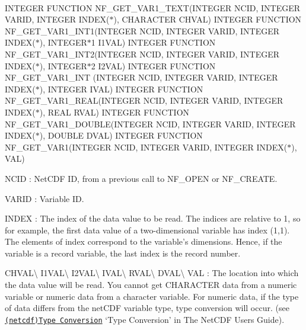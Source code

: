  

I\+N\+T\+E\+G\+ER F\+U\+N\+C\+T\+I\+ON N\+F\+\_\+\+G\+E\+T\+\_\+\+V\+A\+R1\+\_\+\+T\+E\+XT(I\+N\+T\+E\+G\+ER N\+C\+ID, I\+N\+T\+E\+G\+ER V\+A\+R\+ID, I\+N\+T\+E\+G\+ER I\+N\+D\+E\+X($\ast$), C\+H\+A\+R\+A\+C\+T\+ER C\+H\+V\+AL) I\+N\+T\+E\+G\+ER F\+U\+N\+C\+T\+I\+ON N\+F\+\_\+\+G\+E\+T\+\_\+\+V\+A\+R1\+\_\+\+I\+N\+T1(I\+N\+T\+E\+G\+ER N\+C\+ID, I\+N\+T\+E\+G\+ER V\+A\+R\+ID, I\+N\+T\+E\+G\+ER I\+N\+D\+E\+X($\ast$), I\+N\+T\+E\+G\+E\+R$\ast$1 I1\+V\+AL) I\+N\+T\+E\+G\+ER F\+U\+N\+C\+T\+I\+ON N\+F\+\_\+\+G\+E\+T\+\_\+\+V\+A\+R1\+\_\+\+I\+N\+T2(I\+N\+T\+E\+G\+ER N\+C\+ID, I\+N\+T\+E\+G\+ER V\+A\+R\+ID, I\+N\+T\+E\+G\+ER I\+N\+D\+E\+X($\ast$), I\+N\+T\+E\+G\+E\+R$\ast$2 I2\+V\+AL) I\+N\+T\+E\+G\+ER F\+U\+N\+C\+T\+I\+ON N\+F\+\_\+\+G\+E\+T\+\_\+\+V\+A\+R1\+\_\+\+I\+NT (I\+N\+T\+E\+G\+ER N\+C\+ID, I\+N\+T\+E\+G\+ER V\+A\+R\+ID, I\+N\+T\+E\+G\+ER I\+N\+D\+E\+X($\ast$), I\+N\+T\+E\+G\+ER I\+V\+AL) I\+N\+T\+E\+G\+ER F\+U\+N\+C\+T\+I\+ON N\+F\+\_\+\+G\+E\+T\+\_\+\+V\+A\+R1\+\_\+\+R\+E\+AL(I\+N\+T\+E\+G\+ER N\+C\+ID, I\+N\+T\+E\+G\+ER V\+A\+R\+ID, I\+N\+T\+E\+G\+ER I\+N\+D\+E\+X($\ast$), R\+E\+AL R\+V\+AL) I\+N\+T\+E\+G\+ER F\+U\+N\+C\+T\+I\+ON N\+F\+\_\+\+G\+E\+T\+\_\+\+V\+A\+R1\+\_\+\+D\+O\+U\+B\+LE(I\+N\+T\+E\+G\+ER N\+C\+ID, I\+N\+T\+E\+G\+ER V\+A\+R\+ID, I\+N\+T\+E\+G\+ER I\+N\+D\+E\+X($\ast$), D\+O\+U\+B\+LE D\+V\+AL) I\+N\+T\+E\+G\+ER F\+U\+N\+C\+T\+I\+ON N\+F\+\_\+\+G\+E\+T\+\_\+\+V\+A\+R1(I\+N\+T\+E\+G\+ER N\+C\+ID, I\+N\+T\+E\+G\+ER V\+A\+R\+ID, I\+N\+T\+E\+G\+ER I\+N\+D\+E\+X($\ast$), V\+AL)

{\ttfamily N\+C\+ID} \+: Net\+C\+DF ID, from a previous call to N\+F\+\_\+\+O\+P\+EN or N\+F\+\_\+\+C\+R\+E\+A\+TE.

{\ttfamily V\+A\+R\+ID} \+: Variable ID.

{\ttfamily I\+N\+D\+EX} \+: The index of the data value to be read. The indices are relative to 1, so for example, the first data value of a two-\/dimensional variable has index (1,1). The elements of index correspond to the variable’s dimensions. Hence, if the variable is a record variable, the last index is the record number.

{\ttfamily C\+H\+V\+AL}\textbackslash{} {\ttfamily I1\+V\+AL}\textbackslash{} {\ttfamily I2\+V\+AL}\textbackslash{} {\ttfamily I\+V\+AL}\textbackslash{} {\ttfamily R\+V\+AL}\textbackslash{} {\ttfamily D\+V\+AL}\textbackslash{} {\ttfamily V\+AL} \+: The location into which the data value will be read. You cannot get C\+H\+A\+R\+A\+C\+T\+ER data from a numeric variable or numeric data from a character variable. For numeric data, if the type of data differs from the net\+C\+DF variable type, type conversion will occur. (see \href{netcdf.html#Type-Conversion}{\tt (netcdf)Type Conversion} ‘\+Type Conversion’ in The Net\+C\+DF Users Guide).

